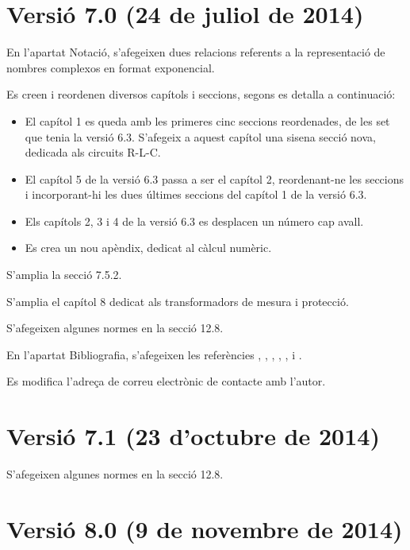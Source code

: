 \section*{Versió 7.0 (24 de juliol de 2014)}

En l'apartat Notació, s'afegeixen dues  relacions referents a la representació de nombres complexos en format exponencial.

Es creen i reordenen diversos capítols i seccions, segons es detalla a continuació:
\begin{itemize}
   \item El capítol 1 es queda amb les primeres cinc seccions reordenades, de les set que tenia la versió 6.3. S'afegeix a aquest capítol una sisena secció nova, dedicada als circuits R-L-C.
   \item El capítol 5 de la versió 6.3 passa a ser el capítol 2, reordenant-ne les  seccions i incorporant-hi les dues últimes seccions del capítol 1 de la versió 6.3.
   \item Els capítols 2, 3 i 4  de la versió 6.3 es desplacen un número cap avall.
   \item Es crea un nou apèndix, dedicat al càlcul numèric.
\end{itemize}

S'amplia la secció 7.5.2.

S'amplia el capítol 8 dedicat als transformadors de mesura i protecció.

S'afegeixen algunes normes en la secció 12.8.

En l'apartat Bibliografia, s'afegeixen les referències \cite{GOM}, \cite{SPK}, \cite{JDH}, \cite{EJB},  \cite{PMA}, \cite{MAI} i \cite{KNU}.

Es modifica l'adreça de correu electrònic de contacte amb l'autor.


\section*{Versió 7.1 (23 d'octubre de 2014)}

S'afegeixen algunes normes en la secció 12.8.


\section*{Versió 8.0 (9 de novembre de 2014)}


